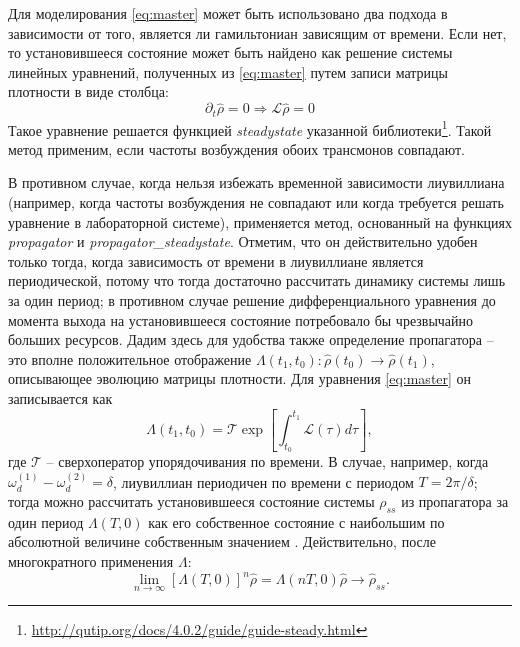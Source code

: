 \documentclass[14pt, a4paper]{extreport}
\numberwithin{equation}{section}
\begin{document}
Для моделирования \eqref{eq:master} может быть использовано два подхода в зависимости от того, является ли гамильтониан зависящим от времени. Если нет, то установившееся состояние может быть найдено как решение системы линейных уравнений, полученных из \eqref{eq:master} путем записи матрицы плотности в виде столбца:
\begin{equation}
\partial_t \hat \rho = 0  \Rightarrow \mathcal{L} 
\hat \rho = 0
\label{eq:steady}
\end{equation}
Такое уравнение решается функцией \foreignlanguage{english}{\textit{steadystate}} указанной библиотеки\footnote{\url{http://qutip.org/docs/4.0.2/guide/guide-steady.html}}. Такой метод применим, если частоты возбуждения обоих трансмонов совпадают.

В противном случае, когда нельзя избежать временной зависимости лиувиллиана (например, когда частоты возбуждения не совпадают или когда требуется решать уравнение в лабораторной системе), применяется метод, основанный на функциях \textit{propagator} и \textit{propagator_steadystate}. Отметим, что он действительно удобен только тогда, когда зависимость от времени в лиувиллиане является периодической, потому что тогда достаточно рассчитать динамику системы лишь за один период; в противном случае решение дифференциального уравнения до момента выхода на установившееся состояние потребовало бы чрезвычайно больших ресурсов. Дадим здесь для удобства также определение пропагатора -- это вполне положительное отображение \cite{oseledets1983completely} $\Lambda(t_1, t_0): \hat \rho(t_0) \rightarrow 
\hat \rho(t_1)$, описывающее эволюцию матрицы плотности. Для уравнения \eqref{eq:master} он записывается как
\begin{equation}
\Lambda(t_1, t_0) = \mathcal{T} \exp \left[\int_{t_0}^{t_1} \mathcal L(\tau) d\tau\right],
\label{eq:propagator}
\end{equation}
где $\mathcal T$ -- сверхоператор упорядочивания по времени. В случае, например, когда $\omega_d^{(1)} - \omega_d^{(2)} = \delta$, лиувиллиан периодичен по времени с периодом $T = 2\pi/\delta$; тогда можно рассчитать установившееся состояние системы $\rho_{ss}$ из пропагатора за один период $\Lambda(T, 0)$ как его собственное состояние с наибольшим по абсолютной величине собственным значением \cite{dittrich1998quantum, rivas2012open}. Действительно, после многократного применения $\Lambda$:
\[
\lim_{n\to \infty} \left[\Lambda(T, 0)\right]^n \hat \rho = \Lambda(nT, 0) \hat \rho \to \hat \rho_{ss}.
\]
\vspace{0.5cm}
\end{document}
